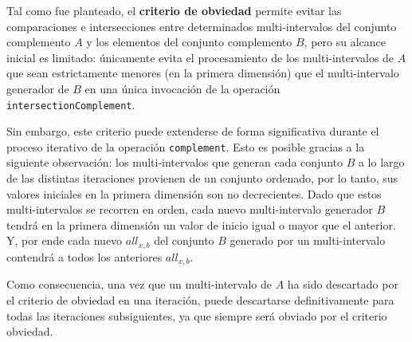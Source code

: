 Tal como fue planteado, el \textbf{criterio de obviedad} permite evitar las comparaciones e intersecciones entre determinados multi-intervalos del conjunto complemento $A$ y los elementos del conjunto complemento $B$, pero su alcance inicial es limitado: únicamente evita el procesamiento de los multi-intervalos de $A$ que sean estrictamente menores (en la primera dimensión) que el multi-intervalo generador de $B$ en una única invocación de la operación \texttt{intersectionComplement}.

Sin embargo, este criterio puede extenderse de forma significativa durante el proceso iterativo de la operación \texttt{complement}. Esto es posible gracias a la siguiente observación: los multi-intervalos que generan cada conjunto $B$ a lo largo de las distintas iteraciones provienen de un conjunto ordenado, por lo tanto, sus valores iniciales en la primera dimensión son no decrecientes. Dado que estos multi-intervalos se recorren en orden, cada nuevo multi-intervalo generador $B$ tendrá en la primera dimensión un valor de inicio igual o mayor que el anterior. Y, por ende cada nuevo $\textit{all}_{x,b}$ del conjunto $B$ generado por un multi-intervalo contendrá a todos los anteriores $\textit{all}_{x,b}$.

Como consecuencia, una vez que un multi-intervalo de $A$ ha sido descartado por el criterio de obviedad en una iteración, puede descartarse definitivamente para todas las iteraciones subsiguientes, ya que siempre será obviado por el criterio obviedad.

